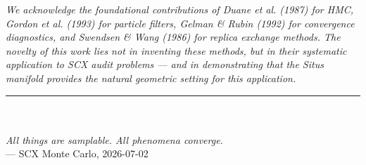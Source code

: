 \documentclass[12pt,a4paper]{article}
\theoremstyle{plain}
\theoremstyle{definition}
\begin{document}
\vspace{12pt}
\noindent\textit{We acknowledge the foundational contributions of Duane et al. (1987)
for HMC, Gordon et al. (1993) for particle filters, Gelman \& Rubin (1992) for
convergence diagnostics, and Swendsen \& Wang (1986) for replica exchange methods.
The novelty of this work lies not in inventing these methods, but in their
systematic application to SCX audit problems — and in demonstrating that the
Situs manifold provides the natural geometric setting for this application.}

\vspace{24pt}

\begin{center}
\rule{0.5\textwidth}{0.5pt}\\[6pt]
{\large \textcolor{scxblue}{\textbf{}}}\\[4pt]
{\normalsize \textit{All things are samplable. All phenomena converge.}}\\[4pt]
{\small \textcolor{scxgray}{— SCX Monte Carlo, 2026-07-02}}
\end{center}
\end{document}
